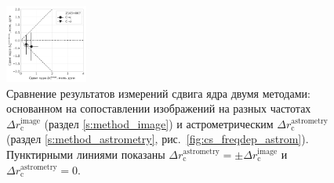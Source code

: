 \begin{figure}
 \includegraphics[width=0.24\textwidth]{rel_vs_astrom/2145+067}
 \caption{Сравнение результатов измерений сдвига ядра двумя методами: основанном на сопоставлении
изображений на разных частотах $\Delta r_\text{c}^\text{image}$ (раздел \ref{s:method_image}) и
астрометрическим $\Delta r_\text{c}^\text{astrometry}$ (раздел \ref{s:method_astrometry},
рис.~\ref{fig:cs_freqdep_astrom}). Пунктирными линиями показаны $\Delta
r_\text{c}^\text{astrometry}=\pm \Delta r_\text{c}^\text{image}$ и $\Delta
r_\text{c}^\text{astrometry}= 0$.}
 \label{fig:rel_vs_astrom}
\end{figure}


\clearpage


